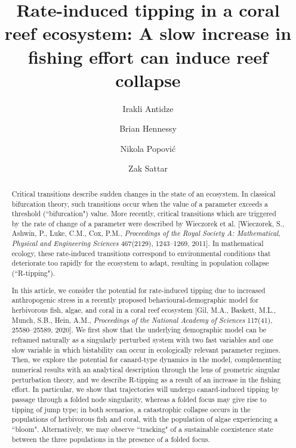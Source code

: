 \documentclass{article}
\theoremstyle{definition}
\numberwithin{equation}{section}
\begin{document}
\title{Rate-induced tipping in a coral reef ecosystem: A slow increase in fishing effort can induce reef collapse}
\author[$1$]{Irakli Antidze}
\author[$1,2$]{Brian Hennessy} 
\author[$1$]{Nikola Popovi\'c}
\author[$1$]{Zak Sattar}

\maketitle

\begin{abstract}
    \noindent
Critical transitions describe sudden changes in the state of an ecosystem. In classical bifurcation theory, such transitions occur when the value of a parameter exceeds a threshold (``bifurcation") value. More recently, critical transitions which are triggered by the rate of change of a parameter were described by Wieczorek et al. [Wieczorek, S., Ashwin, P., Luke, C.M., Cox, P.M., \textit{Proceedings of the Royal Society A: Mathematical, Physical and Engineering Sciences} 467(2129), 1243--1269, 2011]. In mathematical ecology, these rate-induced transitions correspond to environmental conditions that deteriorate too rapidly for the ecosystem to adapt, resulting in population collapse (``R-tipping").

In this article, we consider the potential for rate-induced tipping due to increased anthropogenic stress in a recently proposed behavioural-demographic model for herbivorous fish, algae, and coral in a coral reef ecosystem [Gil, M.A., Baskett, M.L., Munch, S.B., Hein, A.M., \textit{Proceedings of the National Academy of Sciences} 117(41), 25580--25589, 2020]. We first show that the underlying demographic model can be reframed naturally as a singularly perturbed system with two fast variables and one slow variable in which bistability can occur in ecologically relevant parameter regimes. Then, we explore the potential for canard-type dynamics in the model, complementing numerical results with an analytical description through the lens of geometric singular perturbation theory, and we describe R-tipping as a result of an increase in the fishing effort. In particular, we show that trajectories will undergo canard-induced tipping by passage through a folded node singularity, whereas a folded focus may give rise to tipping of jump type; in both scenarios, a catastrophic collapse occurs in the populations of herbivorous fish and coral, with the population of algae experiencing a ``bloom". Alternatively, we may observe ``tracking" of a sustainable coexistence state between the three populations in the presence of a folded focus.
\end{abstract}
\end{document}
